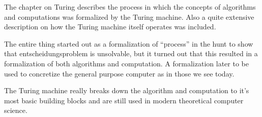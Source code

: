 \documentclass{article}
\begin{document}
    The chapter on Turing describes the process in which the concepts of
    algorithms and computations was formalized by the Turing machine. 
    Also a quite extensive description on how the Turing machine itself
    operates was included.

    The entire thing started out as a formalization of ``process'' in the hunt to show that
    entscheidungsproblem is unsolvable, but it turned out that this resulted in
    a formalization of both algorithms and computation. A formalization later to
    be used to concretize the general purpose computer as in those we see today.

    The Turing machine really breaks down the algorithm and computation to it's
    most basic building blocks and are still used in modern theoretical computer
    science.
\end{document}
